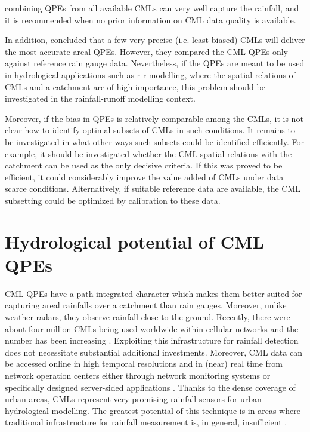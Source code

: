 \documentclass{ctuthesis}\usepackage[]{graphicx}\usepackage[]{color}
\begin{document}
combining QPEs from all available CMLs can very well capture the rainfall, and it is recommended when no prior information on CML data quality is available.

In addition, \cite{fenclCommercialMicrowaveLinks2015} concluded that a few very precise (i.e. least biased) CMLs will deliver the most accurate areal QPEs. However, they compared the CML QPEs only against reference rain gauge data. Nevertheless, if the QPEs are meant to be used in hydrological applications such as r-r modelling, where the spatial relations of CMLs and a catchment are of high importance, this problem should be investigated in the rainfall-runoff modelling context.

Moreover, if the bias in QPEs is relatively comparable among the CMLs, it is not clear how to identify optimal subsets of CMLs in such conditions. It remains to be investigated in what other ways such subsets could be identified efficiently. 
For example, it should be investigated whether the CML spatial relations with the catchment can be used as the only decisive criteria. If this was proved to be efficient, it could considerably improve the value added of CMLs under data scarce conditions.
Alternatively, if suitable reference data are available, the CML subsetting could be optimized by calibration to these data.


\section{Hydrological potential of CML QPEs}

CML QPEs have a path-integrated character which makes them better suited for capturing areal rainfalls over a catchment than rain gauges. Moreover, unlike weather radars, they observe rainfall close to the ground. Recently, there were about four million CMLs being used worldwide within cellular networks and the number has been increasing \citep{ericssonEricssonMicrowaveOutlook2016}. Exploiting this infrastructure for rainfall detection does not necessitate substantial additional investments. Moreover, CML data can be accessed online in high temporal resolutions and in (near) real time from network operation centers either through network monitoring systems or specifically designed server-sided applications \citep{chwalaRealtimeDataAcquisition2016}. Thanks to the dense coverage of urban areas, CMLs represent very promising rainfall sensors for urban hydrological modelling. The greatest potential of this technique is in areas where traditional infrastructure for rainfall measurement is, in general, insufficient \citep{gossetImprovingRainfallMeasurement2016}.
\end{document}
